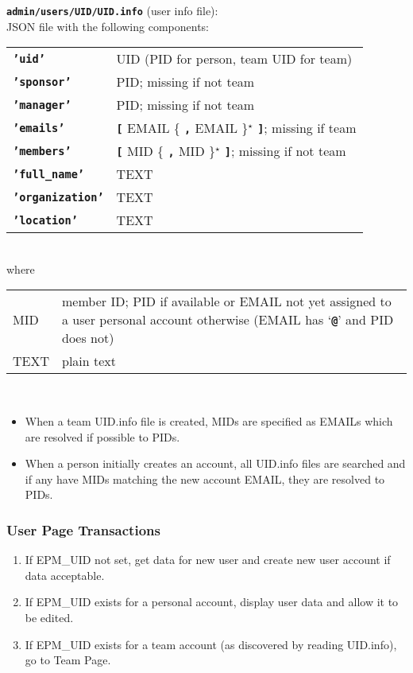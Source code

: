 \documentclass[12pt]{article}
\newenvironment{indpar}[1][0.4in]%
	{\begin{list}{}%
		     {\setlength{\itemsep}{0in}%
		      \setlength{\topsep}{0in}%
		      \setlength{\parsep}{1ex}%
		      \setlength{\labelwidth}{#1}%
		      \setlength{\leftmargin}{#1}%
		      \addtolength{\leftmargin}{\labelsep}}%
	 \item}%
	{\end{list}}
\newenvironment{itemlist}[1][0.2in]%
	{\begin{list}{}{\setlength{\labelwidth}{#1}%
		        \setlength{\leftmargin}{\labelwidth}%
		        \addtolength{\leftmargin}{+0.2in}%
		        \addtolength{\linewidth}{-\labelwidth}%
		        \addtolength{\linewidth}{-0.2in}%
		        \renewcommand{\makelabel}[1]{##1\hfill}}
	 \raggedright}%
	{\end{list}}
\newcommand{\TT}[1]{{\tt \bfseries #1}}
\newcommand{\STAR}{{\Large $^\star$}}
\begin{document}
\begin{indpar}
\begin{itemlist}
\item[\TT{admin/users/UID/UID.info} (user info file):]~
\label{ADMIN/USERS/UID/UID.INFO} \\
JSON file with the following components:
\begin{tabular}[t]{ll}
\TT{'uid'} & UID (PID for person, team UID for team) \\
\TT{'sponsor'} & PID; missing if not team \\
\TT{'manager'} & PID; missing if not team \\
\TT{'emails'} & \TT{[} EMAIL \{ \TT{,} EMAIL \}\STAR{} \TT{]};
                missing if team \\
\TT{'members'} & \TT{[} MID \{ \TT{,} MID \}\STAR{} \TT{]};
                missing if not team \\
\TT{'full\_name'} & TEXT \\
\TT{'organization'} & TEXT \\
\TT{'location'} & TEXT \\
\end{tabular}
\\
where
\\
\begin{tabular}[t]{lp{4.0in}}
MID & member ID; PID if available or EMAIL not yet assigned to a user
      personal account otherwise (EMAIL has `\TT{@}' and PID does not) \\
TEXT & plain text \\
\end{tabular}
\\
\begin{itemize}
\item When a team UID.info file is created, MIDs are specified
as EMAILs which are resolved if possible to PIDs.
\item When a person initially creates an account, all
UID.info files are searched and if any have MIDs matching
the new account EMAIL, they are resolved to PIDs.
\end{itemize}

\end{itemlist}
\end{indpar}

\subsubsection{User Page Transactions}

\begin{enumerate}
\item If EPM\_UID not set, get data for new user and create
      new user account if data acceptable.
\item If EPM\_UID exists for a personal account, display
      user data and allow it to be edited.
\item If EPM\_UID exists for a team account (as discovered
      by reading UID.info), go to Team Page.
\end{enumerate}
\end{document}
